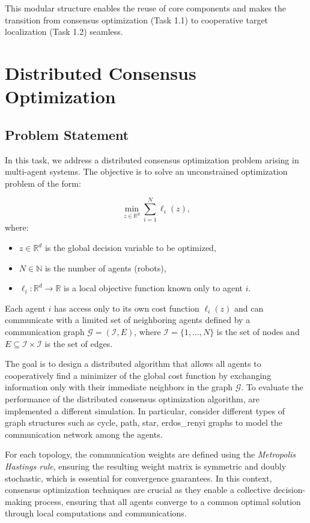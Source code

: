 This modular structure enables the reuse of core components and makes the transition from consensus optimization (Task 1.1) to cooperative target localization (Task 1.2) 
seamless.



\section{Distributed Consensus Optimization}

\subsection{Problem Statement}
In this task, we address a distributed consensus optimization problem arising in multi-agent systems. The objective is to solve an unconstrained optimization problem of the 
form:

\begin{equation}
    \min_{z \in \mathbb{R}^d} \sum_{i=1}^N \ell_i(z),
\end{equation}
where:
\begin{itemize}
    \item \( z \in \mathbb{R}^d \) is the global decision variable to be optimized,
    \item \( N \in \mathbb{N} \) is the number of agents (robots),
    \item \( \ell_i: \mathbb{R}^d \rightarrow \mathbb{R} \) is a local objective function known only to agent \( i \).
\end{itemize}

Each agent \( i \) has access only to its own cost function \( \ell_i(z) \) and can communicate with a limited set of neighboring agents defined by a communication 
graph \( \mathcal{G} = (\mathcal{I}, {E}) \), where \( \mathcal{I} = \{1, \dots, N\} \) is the set of nodes and \( E \subseteq \mathcal{I} \times \mathcal{I} \) is the set 
of edges. 

\noindent
The goal is to design a distributed algorithm that allows all agents to cooperatively find a minimizer of the global cost function by exchanging information only 
with their immediate neighbors in the graph \( \mathcal{G} \).
\noindent
To evaluate the performance of the distributed consensus optimization algorithm, are implemented a different simulation. In particular, consider different types of
graph structures such as cycle, path, star, erdos\_renyi graphs to model the communication network among the agents. 

\noindent For each topology, the communication weights are defined using the \textit{Metropolis Hastings rule}, ensuring the resulting weight matrix is symmetric and 
doubly stochastic, which is essential for convergence guarantees.
\noindent
In this context, consensus optimization techniques are crucial as they enable a collective decision-making process, ensuring that all agents converge to a 
common optimal solution through local computations and communications.



